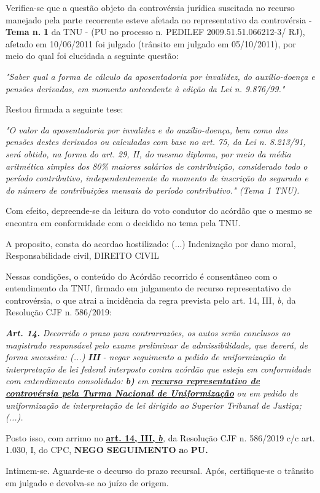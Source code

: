 \documentclass[12pt]{article}
\begin{document}
\justifying
\noindent Verifica-se que a questão objeto da controvérsia jurídica suscitada no recurso manejado pela parte recorrente esteve afetada no representativo da controvérsia - \textbf{Tema n. }\textbf{1} da TNU - (PU no processo n. PEDILEF 2009.51.51.066212-3/ RJ),  afetado em 10/06/2011 foi julgado (trânsito em julgado em 05/10/2011), por meio do qual foi elucidada a seguinte questão:

\noindent \textit{"Saber qual a forma de cálculo da aposentadoria por invalidez, do auxílio-doença e pensões derivadas, em momento antecedente à edição da Lei n. 9.876/99."}

\noindent Restou firmada a seguinte tese:

\noindent \textit{"O valor da aposentadoria por invalidez e do auxílio-doença, bem como das pensões destes derivados ou calculadas com base no art. 75, da Lei n. 8.213/91, será obtido, na forma do art. 29, II, do mesmo diploma, por meio da média aritmética simples dos 80\% maiores salários de contribuição, considerado todo o período contributivo, independentemente do momento de inscrição do segurado e do número de contribuições mensais do período contributivo." (Tema 1 TNU).}

\noindent Com efeito, depreende-se da leitura do voto condutor do acórdão que o mesmo se encontra em conformidade com o decidido no  tema pela TNU.

\noindent A proposito, consta do acordao hostilizado: (...) Indenização por dano moral, Responsabilidade civil, DIREITO CIVIL

\noindent Nessas condições, o conteúdo do Acórdão recorrido é consentâneo com o entendimento da TNU, firmado em julgamento de recurso representativo de controvérsia, o que atrai a incidência da regra prevista pelo art. 14, III, \textit{b,} da Resolução CJF n. 586/2019:

\noindent \textit{\textbf{Art. 14.}}\textit{ Decorrido o prazo para contrarrazões, os autos serão conclusos ao magistrado responsável pelo exame preliminar de admissibilidade, que deverá, de forma sucessiva: (...) }\textit{\textbf{III }}\textit{- negar seguimento a pedido de uniformização de interpretação de lei federal interposto contra acórdão que esteja em conformidade com entendimento consolidado: }\textit{\textbf{b)}}\textit{ em }\uline{\textit{\textbf{recurso representativo de controvérsia pela Turma Nacional de Uniformização}}}\textit{ ou em pedido de uniformização de interpretação de lei dirigido ao Superior Tribunal de Justiça;(...).}

\noindent Posto isso, com arrimo no \uline{\textbf{art. 14, III, }}\uline{\textit{\textbf{b}}}\textit{,} da Resolução CJF n. 586/2019 c/c art. 1.030, I, do CPC, \textbf{NEGO SEGUIMENTO }\textbf{a}o\textbf{ PU}\textbf{.}

\noindent Intimem-se. Aguarde-se o decurso do prazo recursal. Após, certifique-se o trânsito em julgado e devolva-se ao juízo de origem.
\end{document}
